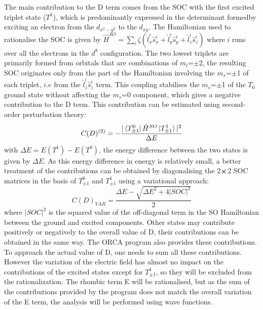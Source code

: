 \documentclass[10pt]{report}
\numberwithin{equation}{section}
\begin{document}
The main contribution to the D term comes from the SOC with the first excited triplet state ($T^1$), which is predominantly expressed in the determinant formedby exciting an electron from the $d_{x^2-y^2}$ to the $d_{xy}$.
The Hamiltonian used to rationalise the SOC is given by $\hat{H}^{SO}=\sum_{i} \zeta(\hat{l}_x^i\hat{s}_x^i+\hat{l}_y^i\hat{s}_y^i+\hat{l}_z^i\hat{s}_z^i)$ where $i$ runs over all the electrons in the $d^8$ configuration.
The two lowest triplets are primarily formed from orbitals that are combinations of $m_l$=$\pm$2, the resulting SOC originates only from the part of the Hamiltonian involving the $m_s$=$\pm$1 of each triplet, $i.e$ from the $\hat{l}_z^i\hat{s}_z^i$ term.
This coupling stabilises the $m_s$=$\pm$1 of the $T_0$ ground state without affecting the $m_s$=0 component, which gives a negative contribution to the D term.
This contribution can be estimated using second-order perturbation theory:
\begin{equation}\label{ContrPert}
    C(D)^{(2)}=-\frac{|\bra{T^0_{\pm1}}\hat{H}^{SO}\ket{T^1_{\pm1}}|^2}{\Delta E}
\end{equation}
with $\Delta E = E(T^1)-E(T^0)$, the energy difference between the two states is given by $\Delta E$.
As this energy difference in energy is relatively small, a better treatment of the contributions can be obtained by diagonalising the 2$\cross$2 SOC matrices in the basis of $T^0_{\pm1}$ and $T^1_{\pm1}$ using a variational approach:
\begin{equation}
    C(D)_{VAR}=\frac{\Delta E -\sqrt{\Delta E^2+4|SOC|^2}}{2}
\end{equation}
where $|SOC|^2$ is the squared value of the off-diagonal term in the SO Hamiltonian between the ground and excited components.
Other states may contribute positively or negatively to the overall value of D, their contributions can be obtained in the same way. 
The ORCA program also provides these contributions. To approach the actual value of D, one needs to sum all these contributions.
However the variation of the electric field has almost no impact on the contributions of the excited states except for $T^1_{\pm1}$, so they will be excluded from the rationalization.
The rhombic term E will be rationalised, but as the sum of the contributions provided by the program does not match the overall variation of the E term, the analysis will be performed using wave functions.
\end{document}
